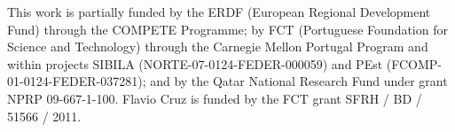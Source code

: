 
This work is partially funded by the ERDF (European Regional
      Development Fund) through the COMPETE Programme; by FCT (Portuguese
         Foundation for Science and Technology) through the Carnegie Mellon
      Portugal Program and within projects SIBILA
      (NORTE-07-0124-FEDER-000059) and PEst
      (FCOMP-01-0124-FEDER-037281); and by the Qatar National Research Fund under grant NPRP 09-667-1-100.
Flavio Cruz is funded by the FCT grant SFRH / BD / 51566 / 2011.
